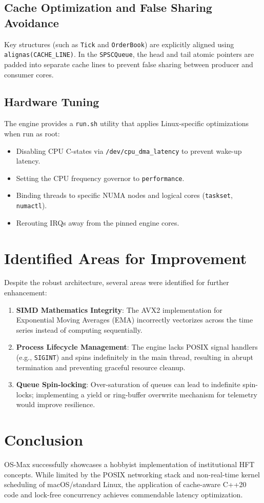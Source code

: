 \documentclass{article}
\begin{document}
\subsection{Cache Optimization and False Sharing Avoidance}
Key structures (such as \texttt{Tick} and \texttt{OrderBook}) are explicitly aligned using \texttt{alignas(CACHE\_LINE)}. In the \texttt{SPSCQueue}, the head and tail atomic pointers are padded into separate cache lines to prevent false sharing between producer and consumer cores.

\subsection{Hardware Tuning}
The engine provides a \texttt{run.sh} utility that applies Linux-specific optimizations when run as root:
\begin{itemize}
    \item Disabling CPU C-states via \texttt{/dev/cpu\_dma\_latency} to prevent wake-up latency.
    \item Setting the CPU frequency governor to \texttt{performance}.
    \item Binding threads to specific NUMA nodes and logical cores (\texttt{taskset}, \texttt{numactl}).
    \item Rerouting IRQs away from the pinned engine cores.
\end{itemize}

\section{Identified Areas for Improvement}
Despite the robust architecture, several areas were identified for further enhancement:
\begin{enumerate}
    \item \textbf{SIMD Mathematics Integrity}: The AVX2 implementation for Exponential Moving Averages (EMA) incorrectly vectorizes across the time series instead of computing sequentially.
    \item \textbf{Process Lifecycle Management}: The engine lacks POSIX signal handlers (e.g., \texttt{SIGINT}) and spins indefinitely in the main thread, resulting in abrupt termination and preventing graceful resource cleanup.
    \item \textbf{Queue Spin-locking}: Over-saturation of queues can lead to indefinite spin-locks; implementing a yield or ring-buffer overwrite mechanism for telemetry would improve resilience.
\end{enumerate}

\section{Conclusion}
OS-Max successfully showcases a hobbyist implementation of institutional HFT concepts. While limited by the POSIX networking stack and non-real-time kernel scheduling of macOS/standard Linux, the application of cache-aware C++20 code and lock-free concurrency achieves commendable latency optimization.
\end{document}
